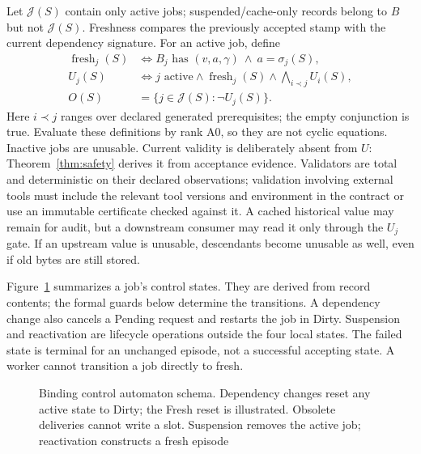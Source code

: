 \documentclass[pdflatex,sn-mathphys-num]{sn-jnl}
\theoremstyle{thmstyleone}
\theoremstyle{thmstylethree}
\theoremstyle{thmstyletwo}
\newcommand{\Jobs}{\mathcal J}
\newcommand{\Sig}{\sigma}
\newcommand{\fresh}{\operatorname{fresh}}
\begin{document}
Let $\Jobs(S)$ contain only active jobs; suspended/cache-only records belong to $B$ but not $\Jobs(S)$. Freshness compares the previously accepted stamp with the current dependency signature. For an active job, define
\begin{align}
\fresh_j(S)&\iff B_j\text{ has }(v,a,\gamma)\ \land\ a=\Sig_j(S),\label{eq:fresh}\\
U_j(S)&\iff j\text{ active}\land\fresh_j(S)\land\bigwedge_{i\prec j}U_i(S),\label{eq:usable}\\
O(S)&=\{j\in\Jobs(S):\neg U_j(S)\}.\label{eq:obligation}
\end{align}
Here $i\prec j$ ranges over declared generated prerequisites; the empty conjunction is true. Evaluate these definitions by rank A0, so they are not cyclic equations. Inactive jobs are unusable. Current validity is deliberately absent from $U$: Theorem~\ref{thm:safety} derives it from acceptance evidence. Validators are total and deterministic on their declared observations; validation involving external tools must include the relevant tool versions and environment in the contract or use an immutable certificate checked against it. A cached historical value may remain for audit, but a downstream consumer may read it only through the $U_j$ gate. If an upstream value is unusable, descendants become unusable as well, even if old bytes are still stored.

Figure~\ref{fig:automaton} summarizes a job's control states. They are derived from record contents; the formal guards below determine the transitions. A dependency change also cancels a Pending request and restarts the job in Dirty. Suspension and reactivation are lifecycle operations outside the four local states. The failed state is terminal for an unchanged episode, not a successful accepting state. A worker cannot transition a job directly to fresh.
\begin{figure}[tb]
\centering
{}
\caption{Binding control automaton schema. Dependency changes reset any active state to Dirty; the Fresh reset is illustrated. Obsolete deliveries cannot write a slot. Suspension removes the active job; reactivation constructs a fresh episode}\label{fig:automaton}
\end{figure}
\end{document}
